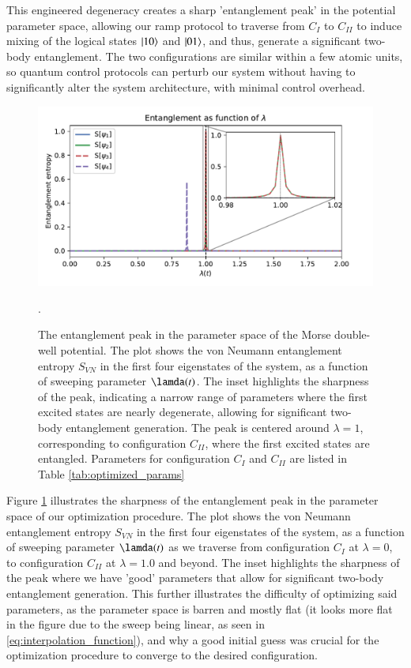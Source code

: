 \documentclass{subfiles}
\begin{document}
This engineered degeneracy creates a sharp 'entanglement peak' in the potential parameter space, allowing our ramp protocol to traverse from $C_I$ to $C_{II}$ to induce mixing of the logical states $\ket{10}$ and $\ket{01}$, and thus, generate a significant two-body entanglement. The two configurations are similar within a few atomic units, so quantum control protocols can perturb our system without having to significantly alter the system architecture, with minimal control overhead.
\begin{figure}
  \centering
  \includegraphics[width=1.0\textwidth]{figs/entanglement_peak.pdf}
  \caption{The entanglement peak in the parameter space of the Morse double-well potential. The plot shows the von Neumann entanglement entropy $S_{VN}$ in the first four eigenstates of the system, as a function of sweeping parameter $\lamda(t)$. The inset highlights the sharpness of the peak, indicating a narrow range of parameters where the first excited states are nearly degenerate, allowing for significant two-body entanglement generation. The peak is centered around $\lambda = 1$, corresponding to configuration $C_{II}$, where the first excited states are entangled. Parameters for configuration $C_I$ and $C_{II}$ are listed in Table \ref{tab:optimized_params}}. 
  \label{fig:entanglement_peak}
\end{figure}
Figure \ref{fig:entanglement_peak} illustrates the sharpness of the entanglement peak in the parameter space of our optimization procedure. The plot shows the von Neumann entanglement entropy $S_{VN}$ in the first four eigenstates of the system, as a function of sweeping parameter $\lamda(t)$ as we traverse from configuration $C_I$ at $\lambda = 0$, to configuration $C_{II}$ at $\lambda = 1.0$ and beyond. The inset highlights the sharpness of the peak where we have 'good' parameters that allow for significant two-body entanglement generation. This further illustrates the difficulty of optimizing said parameters, as the parameter space is barren and mostly flat (it looks more flat in the figure due to the sweep being linear, as seen in \eqref{eq:interpolation_function}), and why a good initial guess was crucial for the optimization procedure to converge to the desired configuration.
\end{document}
